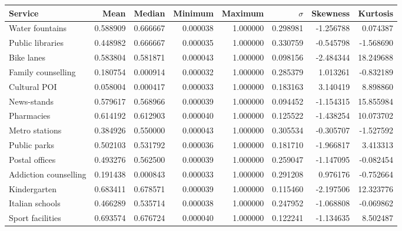 \documentclass[11pt, titlepage]{article}
\begin{document}
 

\begin{landscape}
	\begin{table}
		\centering
		\begin{tabular}{lrrrrrrr}
			\toprule
						  Service &        Mean &      Median &    Minimum &      Maximum &    $\sigma$ &  Skewness &   Kurtosis \\
			\midrule
				  Water fountains &    0.588909 &    0.666667 &   0.000038 &     1.000000 &    0.298981 & -1.256788 &   0.074387 \\
				 Public libraries &    0.448982 &    0.666667 &   0.000035 &     1.000000 &    0.330759 & -0.545798 &  -1.568690 \\
					   Bike lanes &    0.583804 &    0.581871 &   0.000043 &     1.000000 &    0.098156 & -2.484344 &  18.249688 \\
			   Family counselling &    0.180754 &    0.000914 &   0.000032 &     1.000000 &    0.285379 &  1.013261 &  -0.832189 \\
					 Cultural POI &    0.058004 &    0.000417 &   0.000033 &     1.000000 &    0.183163 &  3.140419 &   8.898860 \\
					  News-stands &    0.579617 &    0.568966 &   0.000039 &     1.000000 &    0.094452 & -1.154315 &  15.855984 \\
					   Pharmacies &    0.614192 &    0.612903 &   0.000040 &     1.000000 &    0.125522 & -1.438254 &  10.073702 \\
				   Metro stations &    0.384926 &    0.550000 &   0.000043 &     1.000000 &    0.305534 & -0.305707 &  -1.527592 \\
					 Public parks &    0.502103 &    0.531792 &   0.000036 &     1.000000 &    0.181710 & -1.966817 &   3.413313 \\
				   Postal offices &    0.493276 &    0.562500 &   0.000039 &     1.000000 &    0.259047 & -1.147095 &  -0.082454 \\
			Addiction counselling &    0.191438 &    0.000843 &   0.000033 &     1.000000 &    0.291208 &  0.976176 &  -0.752664 \\
					 Kindergarten &    0.683411 &    0.678571 &   0.000039 &     1.000000 &    0.115460 & -2.197506 &  12.323776 \\
				  Italian schools &    0.466289 &    0.535714 &   0.000038 &     1.000000 &    0.247952 & -1.068808 &  -0.069862 \\
				 Sport facilities &    0.693574 &    0.676724 &   0.000040 &     1.000000 &    0.122241 & -1.134635 &   8.502487 \\

\end{tabular}
\end{table}
\end{landscape}
\end{document}
